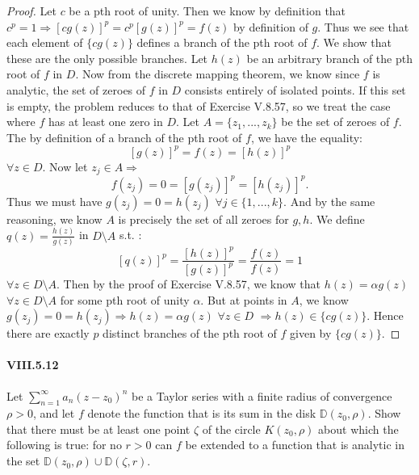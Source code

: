 \documentclass[10pt]{article}
\begin{document}
\begin{proof}
Let $c$ be a pth root of unity. Then we know by definition that $c^p = 1 \Rightarrow [cg(z)]^p = c^p [g(z)]^p = f(z)$ by definition of $g$. Thus we see that each element of $\{cg(z)\}$ defines a branch of the pth root of $f$. We show that these are the only possible branches. Let $h(z)$ be an arbitrary branch of the pth root of $f$ in $D$. Now from the discrete mapping theorem, we know since $f$ is analytic, the set of zeroes of $f$ in $D$ consists entirely of isolated points. If this set is empty, the problem reduces to that of Exercise V.8.57, so we treat the case where $f$ has at least one zero in $D$. Let $A = \{z_1, ..., z_k\}$ be the set of zeroes of $f$. The by definition of a branch of the pth root of $f$, we have the equality: 
\[[g(z)]^p = f(z) = [h(z)]^p\]
$\forall z \in D$. Now let $z_j \in A \Rightarrow$ 
\[f(z_j) = 0 = [g(z_j)]^p = [h(z_j)]^p. \]
Thus we must have $g(z_j) = 0 = h(z_j)$ $\forall j \in \{1,...,k\}$. And by the same reasoning, we know $A$ is precisely the set of all zeroes for $g, h$. We define $q(z) = \frac{h(z)}{g(z)}$ in $D \setminus A$ s.t. : 
\[[q(z)]^p = \frac{[h(z)]^p}{[g(z)]^p} = \frac{f(z)}{f(z)} = 1 \]
$\forall z \in D \setminus A$. Then by the proof of Exercise V.8.57, we know that $h(z) = \alpha g(z)$ $\forall z \in D \setminus A$ for some pth root of unity $\alpha$. But at points in $A$, we know $g(z_j) = 0 = h(z_j) \Rightarrow h(z) = \alpha g(z)$ $\forall z \in D$ $\Rightarrow h(z) \in \{cg(z)\}$. Hence there are exactly $p$ distinct branches of the pth root of $f$ given by $\{cg(z)\}$. 
\end{proof}

\paragraph{VIII.5.12} Let $\sum_{n = 1}^\infty a_n(z- z_0)^n$ be a Taylor series with a finite radius of convergence $\rho > 0$, and let $f$ denote the function that is its sum in the disk $\mathbb{D}(z_0,\rho)$. Show that there must be at least one point $\zeta$ of the circle $K(z_0,\rho)$ about which the following is true: for no $r > 0$ can $f$ be extended to a function that is analytic in the set $\mathbb{D}(z_0,\rho) \cup \mathbb{D}(\zeta,r)$. 
\end{document}
